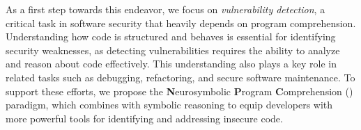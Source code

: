 

As a first step towards this endeavor, we focus on \textit{vulnerability detection}, a critical task in software security that heavily depends on program comprehension. Understanding how code is structured and behaves is essential for identifying security weaknesses, as detecting vulnerabilities requires the ability to analyze and reason about code effectively. This understanding also plays a key role in related tasks such as debugging, refactoring, and secure software maintenance. To support these efforts, we propose the \textbf{N}eurosymbolic \textbf{P}rogram \textbf{C}omprehension (\framework) paradigm, which combines \lcms with symbolic reasoning to equip developers with more powerful tools for identifying and addressing insecure code.




